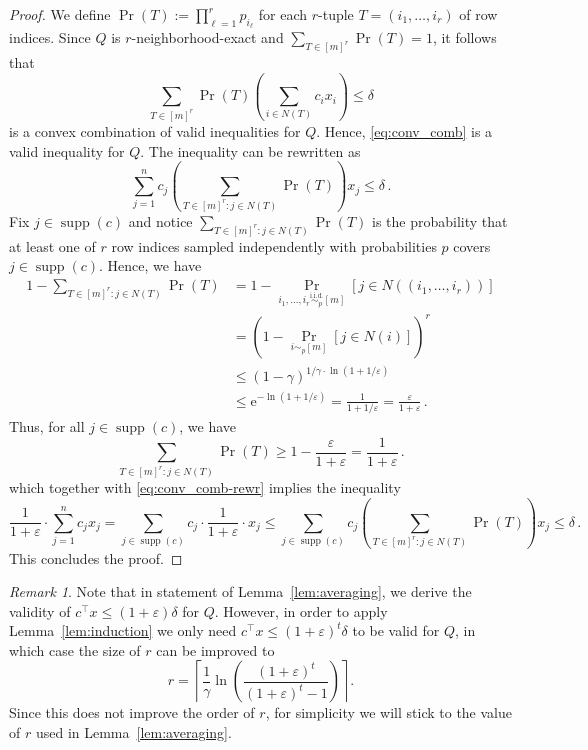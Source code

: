 \documentclass[11pt]{article}
\newcommand{\ceil}[1]{\left\lceil #1 \right\rceil}
\DeclareMathOperator{\supp}{supp}
\newcommand{\proba}{\Pr}
\newcommand{\eps}{\varepsilon}
\newcommand{\numrounds}{t}
\newcommand{\rhs}{\delta}
\newcommand{\covproba}{\gamma}
\newcommand{\numrows}{r}
\newcommand{\rb}[1]{\left(#1\right)}
\theoremstyle{remark}
\newtheorem{remark}{Remark}
\begin{document}
\begin{proof}
	We define $\proba(T) := \prod_{\ell = 1}^\numrows p_{i_\ell}$ for each $\numrows$-tuple $T = (i_1,\ldots,i_\numrows)$ of row indices. Since $Q$ is $\numrows$-neighborhood-exact and $\sum_{T\in [m]^\numrows} \proba(T) = 1$, it follows that
%
\begin{equation}
\label{eq:conv_comb}
	\sum_{T\in [m]^\numrows} \proba(T) \left(\sum_{i \in N(T)} c_i x_i\right) \le \rhs
\end{equation}
%
is a convex combination of valid inequalities for $Q$. Hence, \eqref{eq:conv_comb} is a valid inequality for $Q$. The inequality can be rewritten as
\begin{equation}
\label{eq:conv_comb-rewr}
	\sum_{j = 1}^n c_j \left(\sum_{T\in [m]^\numrows : j \in N(T)} \proba(T)\right) x_j \le \rhs\,.
\end{equation}
	Fix $j \in \supp(c)$ and notice $\sum_{T\in [m]^\numrows : j \in N(T)} \proba(T)$ is the probability that at least one of $\numrows$ row indices sampled independently with probabilities $p$ covers $j \in \supp(c)$. Hence, we have
%
\begin{align*}
	1 - \sum_{T\in [m]^\numrows : j \in N(T)} \proba(T) &= 1 - \proba_{i_1,\ldots,i_{\numrows} \stackrel{\mathrm{i.i.d.}}{\sim_p} [m]} [j \in N((i_1,\dotsc,i_{\numrows}))]\\ 
&= \left(1 - \proba_{i \sim_p [m]} [j \in N(i)]\right)^\numrows\\
&\le (1 - \covproba)^{1/\covproba \cdot \ln (1+1/\eps)}\\
&\le \mathrm{e}^{- \ln (1+1/\eps)} = \frac{1}{1+1/\eps} = \frac{\eps}{1+\eps}\,.
\end{align*}
%
	Thus, for all $j \in \supp(c)$, we have
$$
	\sum_{T\in [m]^r : j \in N(T)} \proba(T) \ge 1 - \frac{\eps}{1+\eps} = \frac{1}{1+\eps}\,.
$$
which together with \eqref{eq:conv_comb-rewr} implies the inequality
$$
	\frac{1}{1+\eps} \cdot \sum_{j = 1}^n c_j x_j = \sum_{j \in \supp(c)} c_j \cdot \frac{1}{1+\eps} \cdot x_j \le \sum_{j \in \supp(c)} c_j \left(\sum_{T\in [m]^\numrows : j \in N(T)} \proba(T)\right) x_j \le \rhs\,.
$$
This concludes the proof.
\end{proof}

\begin{remark}
	Note that in statement of Lemma~\ref{lem:averaging}, we derive the validity of $c^\intercal x \le (1+\eps) \rhs$ for $Q$. However, in order to apply Lemma~\ref{lem:induction} we only need $c^\intercal x \le (1+\eps)^\numrounds \rhs$ to be valid for $Q$, in which case the size of $r$ can be improved to
	\[
	r=\ceil{\frac{1}{\gamma} \ln\rb{\frac{(1+\eps)^\numrounds}{(1+\eps)^\numrounds-1}}}.
	\]
	Since this does not improve the order of $r$, for simplicity we will stick to the value of $r$ used in Lemma~\ref{lem:averaging}.
\end{remark}
\end{document}
